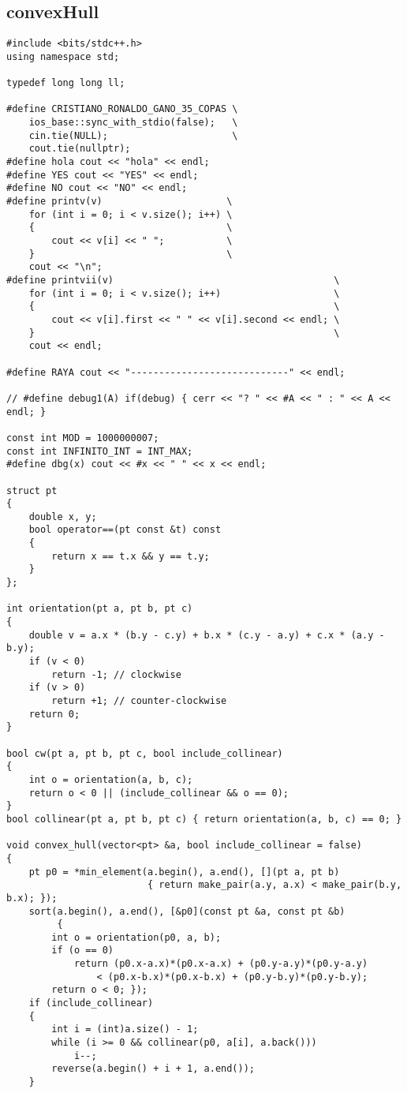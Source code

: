\subsection*{convexHull}
\begin{lstlisting}
#include <bits/stdc++.h>
using namespace std;

typedef long long ll;

#define CRISTIANO_RONALDO_GANO_35_COPAS \
	ios_base::sync_with_stdio(false);   \
	cin.tie(NULL);                      \
	cout.tie(nullptr);
#define hola cout << "hola" << endl;
#define YES cout << "YES" << endl;
#define NO cout << "NO" << endl;
#define printv(v)                      \
	for (int i = 0; i < v.size(); i++) \
	{                                  \
		cout << v[i] << " ";           \
	}                                  \
	cout << "\n";
#define printvii(v)                                       \
	for (int i = 0; i < v.size(); i++)                    \
	{                                                     \
		cout << v[i].first << " " << v[i].second << endl; \
	}                                                     \
	cout << endl;

#define RAYA cout << "----------------------------" << endl;

// #define debug1(A) if(debug) { cerr << "? " << #A << " : " << A << endl; }

const int MOD = 1000000007;
const int INFINITO_INT = INT_MAX;
#define dbg(x) cout << #x << " " << x << endl;

struct pt
{
	double x, y;
	bool operator==(pt const &t) const
	{
		return x == t.x && y == t.y;
	}
};

int orientation(pt a, pt b, pt c)
{
	double v = a.x * (b.y - c.y) + b.x * (c.y - a.y) + c.x * (a.y - b.y);
	if (v < 0)
		return -1; // clockwise
	if (v > 0)
		return +1; // counter-clockwise
	return 0;
}

bool cw(pt a, pt b, pt c, bool include_collinear)
{
	int o = orientation(a, b, c);
	return o < 0 || (include_collinear && o == 0);
}
bool collinear(pt a, pt b, pt c) { return orientation(a, b, c) == 0; }

void convex_hull(vector<pt> &a, bool include_collinear = false)
{
	pt p0 = *min_element(a.begin(), a.end(), [](pt a, pt b)
						 { return make_pair(a.y, a.x) < make_pair(b.y, b.x); });
	sort(a.begin(), a.end(), [&p0](const pt &a, const pt &b)
		 {
        int o = orientation(p0, a, b);
        if (o == 0)
            return (p0.x-a.x)*(p0.x-a.x) + (p0.y-a.y)*(p0.y-a.y)
                < (p0.x-b.x)*(p0.x-b.x) + (p0.y-b.y)*(p0.y-b.y);
        return o < 0; });
	if (include_collinear)
	{
		int i = (int)a.size() - 1;
		while (i >= 0 && collinear(p0, a[i], a.back()))
			i--;
		reverse(a.begin() + i + 1, a.end());
	}


\end{lstlisting}

